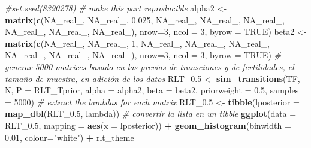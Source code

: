 \documentclass[
]{book}
\newenvironment{Shaded}{\begin{snugshade}}{\end{snugshade}}
\newcommand{\AttributeTok}[1]{\textcolor[rgb]{0.13,0.29,0.53}{#1}}
\newcommand{\CommentTok}[1]{\textcolor[rgb]{0.56,0.35,0.01}{\textit{#1}}}
\newcommand{\ConstantTok}[1]{\textcolor[rgb]{0.56,0.35,0.01}{#1}}
\newcommand{\DecValTok}[1]{\textcolor[rgb]{0.00,0.00,0.81}{#1}}
\newcommand{\FloatTok}[1]{\textcolor[rgb]{0.00,0.00,0.81}{#1}}
\newcommand{\FunctionTok}[1]{\textcolor[rgb]{0.13,0.29,0.53}{\textbf{#1}}}
\newcommand{\NormalTok}[1]{#1}
\newcommand{\OtherTok}[1]{\textcolor[rgb]{0.56,0.35,0.01}{#1}}
\newcommand{\SpecialCharTok}[1]{\textcolor[rgb]{0.81,0.36,0.00}{\textbf{#1}}}
\newcommand{\StringTok}[1]{\textcolor[rgb]{0.31,0.60,0.02}{#1}}
\theoremstyle{definition}
\theoremstyle{definition}
\theoremstyle{definition}
\theoremstyle{definition}
\theoremstyle{remark}
\begin{document}
\begin{Shaded}
\begin{Highlighting}[]
\CommentTok{\#set.seed(8390278) \# make this part reproducible}
\NormalTok{alpha2 }\OtherTok{\textless{}{-}} \FunctionTok{matrix}\NormalTok{(}\FunctionTok{c}\NormalTok{(}\ConstantTok{NA\_real\_}\NormalTok{, }\ConstantTok{NA\_real\_}\NormalTok{, }\FloatTok{0.025}\NormalTok{,}
                  \ConstantTok{NA\_real\_}\NormalTok{, }\ConstantTok{NA\_real\_}\NormalTok{, }\ConstantTok{NA\_real\_}\NormalTok{,}
                  \ConstantTok{NA\_real\_}\NormalTok{, }\ConstantTok{NA\_real\_}\NormalTok{, }\ConstantTok{NA\_real\_}\NormalTok{), }\AttributeTok{nrow=}\DecValTok{3}\NormalTok{, }\AttributeTok{ncol =} \DecValTok{3}\NormalTok{, }\AttributeTok{byrow =} \ConstantTok{TRUE}\NormalTok{)}
\NormalTok{beta2 }\OtherTok{\textless{}{-}} \FunctionTok{matrix}\NormalTok{(}\FunctionTok{c}\NormalTok{(}\ConstantTok{NA\_real\_}\NormalTok{, }\ConstantTok{NA\_real\_}\NormalTok{, }\DecValTok{1}\NormalTok{,}
                  \ConstantTok{NA\_real\_}\NormalTok{, }\ConstantTok{NA\_real\_}\NormalTok{, }\ConstantTok{NA\_real\_}\NormalTok{,}
                  \ConstantTok{NA\_real\_}\NormalTok{, }\ConstantTok{NA\_real\_}\NormalTok{, }\ConstantTok{NA\_real\_}\NormalTok{), }\AttributeTok{nrow=}\DecValTok{3}\NormalTok{, }\AttributeTok{ncol =} \DecValTok{3}\NormalTok{, }\AttributeTok{byrow =} \ConstantTok{TRUE}\NormalTok{)}
\CommentTok{\# generar 5000 matrices basado en las previas de transciones y de fertilidades, el tamaño de muestra, en adición de los datos}
\NormalTok{RLT\_0}\FloatTok{.5} \OtherTok{\textless{}{-}} \FunctionTok{sim\_transitions}\NormalTok{(TF, N, }\AttributeTok{P =}\NormalTok{ RLT\_Tprior, }\AttributeTok{alpha =}\NormalTok{ alpha2, }\AttributeTok{beta =}\NormalTok{ beta2,}
                \AttributeTok{priorweight =} \FloatTok{0.5}\NormalTok{, }\AttributeTok{samples =} \DecValTok{5000}\NormalTok{)}
\CommentTok{\# extract the lambdas for each matrix}
\NormalTok{RLT\_0}\FloatTok{.5} \OtherTok{\textless{}{-}} \FunctionTok{tibble}\NormalTok{(}\AttributeTok{lposterior =} \FunctionTok{map\_dbl}\NormalTok{(RLT\_0}\FloatTok{.5}\NormalTok{, lambda)) }\CommentTok{\# convertir la lista en un tibble}
\FunctionTok{ggplot}\NormalTok{(}\AttributeTok{data =}\NormalTok{ RLT\_0}\FloatTok{.5}\NormalTok{,}
       \AttributeTok{mapping =} \FunctionTok{aes}\NormalTok{(}\AttributeTok{x =}\NormalTok{ lposterior)) }\SpecialCharTok{+} 
  \FunctionTok{geom\_histogram}\NormalTok{(}\AttributeTok{binwidth =} \FloatTok{0.01}\NormalTok{, }\AttributeTok{colour=}\StringTok{"white"}\NormalTok{) }\SpecialCharTok{+} 
\NormalTok{  rlt\_theme}
\end{Highlighting}
\end{Shaded}
\end{document}
